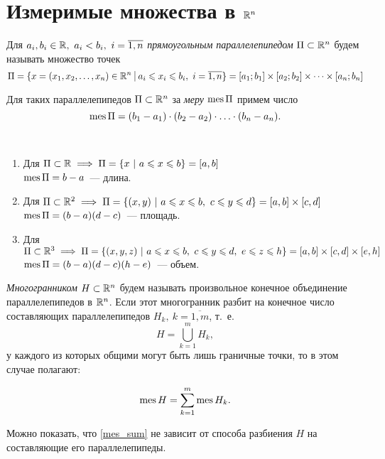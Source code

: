 \documentclass[../../main.tex]{subfiles}
\begin{document}
\section{Измеримые множества в $\mathbb{R}^n$}

Для $a_i, b_i \in \mathbb{R},\ a_i < b_i,\ i = \overline{1,n}$ 
\emph{прямоугольным параллелепипедом}
$\Pi \subset \mathbb{R}^n$ будем называть множество точек
\[
	\Pi = \{x = (x_1, x_2, \ldots, x_n) \in \R^n\ \vline\ 
	a_i \le x_i \le b_i,\ i =
	 \overline{1,n}\} = [a_1; b_1] \times [a_2; b_2] 
	 \times \dots \times [a_n; b_n]
\]

Для таких параллелепипедов $\Pi\subset \mathbb{R}^n$ за 
\emph{меру} $\operatorname{mes}\Pi$ примем число
\begin{equation}
\label{611}
\operatorname{mes}\Pi = (b_1 - a_1) \cdot (b_2 - a_2) \cdot \ldots \cdot (b_n - a_n).
\end{equation}

\begin{example}
    ~
    
	\begin{enumerate}
		\item Для $\Pi \subset \R \implies \Pi = \{x\ |\ 
		a \le x \le b \} = [a, b] $\\
		$\operatorname{mes}\Pi = b - a$~--- длина. 
		\item Для $\Pi \subset \mathbb{R}^2 \implies \Pi = 
		\{(x,y)\ |\ a \leqslant x \leqslant b,\ c \leqslant y \leqslant d \} = [a, b] \times [c, d]$\\
		$\operatorname{mes} \Pi = (b - a)(d - c)$~--- площадь. 
		\item Для $\Pi \subset \mathbb{R}^3 \implies \Pi = 
		\{(x,y,z)\ |\ a \leqslant x \leqslant b,\ c \leqslant y \leqslant d,\ e \leqslant z \leqslant h \} = 
		[a, b] \times [c, d] \times [e, h] $\\
		$\operatorname{mes}\Pi = (b - a)(d - c)(h - e)$~--- объем. 
	\end{enumerate}
\end{example}

\emph{Многогранником} $H \subset \mathbb{R}^n$ будем называть произвольное 
конечное объединение параллелепипедов в $\mathbb{R}^n$.
Если этот многогранник разбит на конечное число  составляющих параллелепипедов 
$H_k,\ k = \overline{1,m}$, т.~е.
\[H = \bigcup\limits_{k=1}^m H_k,\]
у каждого из которых общими могут быть лишь
граничные точки, то в этом случае полагают:

\begin{equation}
\label{mes_sum}
\operatorname{mes} H = \sum\limits_{k=1}^{m}  \operatorname{mes} H_k.
\end{equation}

Можно показать, что \eqref{mes_sum} не зависит от способа разбиения $H$ 
на составляющие его параллелепипеды.
\end{document}
